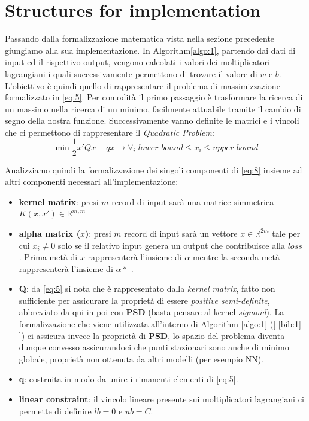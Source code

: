 \documentclass[12pt]{article}
\begin{document}
	\section{Structures for implementation}
	Passando dalla formalizzazione matematica vista nella sezione precedente giungiamo alla sua implementazione. In Algorithm\ref{algo:1}, partendo dai dati di input ed il rispettivo output, vengono calcolati i valori dei moltiplicatori lagrangiani i quali successivamente permettono di trovare il valore di $w$ e $b$.
L’obiettivo è quindi quello di rappresentare il problema di massimizzazione formalizzato in \eqref{eq:5}. Per comodità il primo passaggio è trasformare la ricerca di un massimo nella ricerca di un minimo, facilmente attuabile tramite il cambio di segno della nostra funzione. Successivamente vanno definite le matrici e i vincoli che ci permettono di rappresentare il \textit{Quadratic Problem}:\\
	\begin{equation}\label{eq:8}
		\min \frac{1}{2}x'Qx + qx \longrightarrow \forall_i\; lower\_bound\leq x_i\leq upper\_bound
	\end{equation}

	Analizziamo quindi la formalizzazione dei singoli componenti di \eqref{eq:8} insieme ad altri componenti necessari all'implementazione:
	
	\begin{itemize}
		\item \textbf{kernel matrix}: presi $m$ record di input sarà una matrice simmetrica $ K(x,x') \in \mathbb{R}^{m,m}$
		\item \textbf{alpha matrix ($x$)}: presi $m$ record di input sarà un vettore $ x \in \mathbb{R}^{2m} $ tale per cui $x_i \neq 0$ solo se il relativo input genera un output che contribuisce alla $loss$ . Prima metà di $x$ rappresenterà l'insieme di $\alpha$ mentre la seconda metà rappresenterà l'insieme di $\alpha*$ .
		\item \textbf{Q}: da \eqref{eq:5} si nota che è rappresentato dalla \textit{kernel matrix}, fatto non sufficiente per assicurare la proprietà di essere \textit{positive semi-definite}, abbreviato da qui in poi con \textbf{PSD} (basta pensare al kernel \textit{sigmoid}). La formalizzazione che viene utilizzata all’interno di Algorithm \ref{algo:1} \linebreak({[ \ref{bib:1} ]}) ci assicura invece la proprietà di \textbf{PSD},  lo spazio del problema diventa dunque convesso assicurandoci che punti stazionari sono anche di minimo globale, proprietà non ottenuta da altri modelli (per esempio NN). 
		\item \textbf{q}: costruita in modo da unire i rimanenti elementi di \eqref{eq:5}.
		\item \textbf{linear constraint}: il vincolo lineare presente sui moltiplicatori lagrangiani ci permette di definire $lb=0$ e $ub=C$.
	\end{itemize}
		
\end{document}
